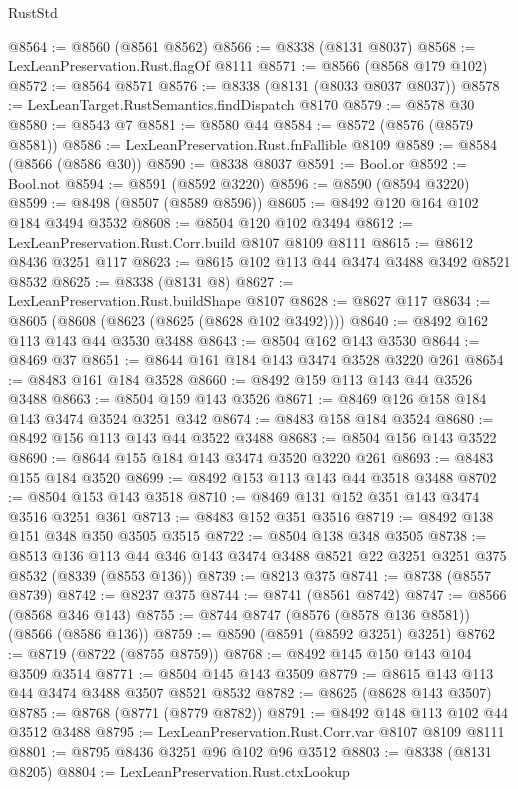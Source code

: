 \begin{lexlean}{RustStd}
\begin{coremodule}
{\begin{coremodule}
{{{{{{{{{{{{{{{{{{{{{{{{{{{{{{{{{{{{{{{{{{{{{@8564 := @8560 (@8561 @8562)
@8566 := @8338 (@8131 @8037)
@8568 := LexLeanPreservation.Rust.flagOf @8111
@8571 := @8566 (@8568 @179 @102)
@8572 := @8564 @8571
@8576 := @8338 (@8131 (@8033 @8037 @8037))
@8578 := LexLeanTarget.RustSemantics.findDispatch @8170
@8579 := @8578 @30
@8580 := @8543 @7
@8581 := @8580 @44
@8584 := @8572 (@8576 (@8579 @8581))
@8586 := LexLeanPreservation.Rust.fnFallible @8109
@8589 := @8584 (@8566 (@8586 @30))
@8590 := @8338 @8037
@8591 := Bool.or
@8592 := Bool.not
@8594 := @8591 (@8592 @3220)
@8596 := @8590 (@8594 @3220)
@8599 := @8498 (@8507 (@8589 @8596))
@8605 := @8492 @120 @164 @102 @184 @3494 @3532
@8608 := @8504 @120 @102 @3494
@8612 := LexLeanPreservation.Rust.Corr.build @8107 @8109 @8111
@8615 := @8612 @8436 @3251 @117
@8623 := @8615 @102 @113 @44 @3474 @3488 @3492 @8521 @8532
@8625 := @8338 (@8131 @8)
@8627 := LexLeanPreservation.Rust.buildShape @8107
@8628 := @8627 @117
@8634 := @8605 (@8608 (@8623 (@8625 (@8628 @102 @3492))))
@8640 := @8492 @162 @113 @143 @44 @3530 @3488
@8643 := @8504 @162 @143 @3530
@8644 := @8469 @37
@8651 := @8644 @161 @184 @143 @3474 @3528 @3220 @261
@8654 := @8483 @161 @184 @3528
@8660 := @8492 @159 @113 @143 @44 @3526 @3488
@8663 := @8504 @159 @143 @3526
@8671 := @8469 @126 @158 @184 @143 @3474 @3524 @3251 @342
@8674 := @8483 @158 @184 @3524
@8680 := @8492 @156 @113 @143 @44 @3522 @3488
@8683 := @8504 @156 @143 @3522
@8690 := @8644 @155 @184 @143 @3474 @3520 @3220 @261
@8693 := @8483 @155 @184 @3520
@8699 := @8492 @153 @113 @143 @44 @3518 @3488
@8702 := @8504 @153 @143 @3518
@8710 := @8469 @131 @152 @351 @143 @3474 @3516 @3251 @361
@8713 := @8483 @152 @351 @3516
@8719 := @8492 @138 @151 @348 @350 @3505 @3515
@8722 := @8504 @138 @348 @3505
@8738 := @8513
    @136
    @113
    @44
    @346
    @143
    @3474
    @3488
    @8521
    @22
    @3251
    @3251
    @375
    @8532
    (@8339 (@8553 @136))
@8739 := @8213 @375
@8741 := @8738 (@8557 @8739)
@8742 := @8237 @375
@8744 := @8741 (@8561 @8742)
@8747 := @8566 (@8568 @346 @143)
@8755 := @8744 @8747 (@8576 (@8578 @136 @8581)) (@8566 (@8586 @136))
@8759 := @8590 (@8591 (@8592 @3251) @3251)
@8762 := @8719 (@8722 (@8755 @8759))
@8768 := @8492 @145 @150 @143 @104 @3509 @3514
@8771 := @8504 @145 @143 @3509
@8779 := @8615 @143 @113 @44 @3474 @3488 @3507 @8521 @8532
@8782 := @8625 (@8628 @143 @3507)
@8785 := @8768 (@8771 (@8779 @8782))
@8791 := @8492 @148 @113 @102 @44 @3512 @3488
@8795 := LexLeanPreservation.Rust.Corr.var @8107 @8109 @8111
@8801 := @8795 @8436 @3251 @96 @102 @96 @3512
@8803 := @8338 (@8131 @8205)
@8804 := LexLeanPreservation.Rust.ctxLookup
}}}}}}}}}}}}}}}}}}}}}}}}}}}}}}}}}}}}}}}}}}}}}
\end{coremodule}}
\end{coremodule}
\end{lexlean}
